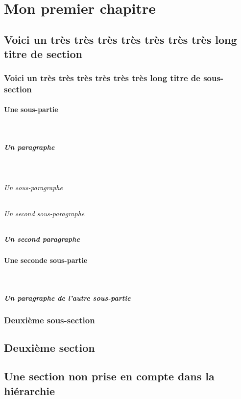 \chapter{Mon premier chapitre}
\section[Un très long titre de section]{Voici un très très très très très très très long titre de section}
\subsection[Un très long titre de sous-section]{Voici un très très très très très très long titre de sous-section}
\blindtext
\subsubsection{Une sous-partie}
\blindtext[2]\\ 
\paragraph{Un paragraphe}
\blindtext[2]\\
\blindtext
\subparagraph{Un sous-paragraphe}
\blindtext[5]
\subparagraph{Un second sous-paragraphe}
\blindtext[4]
\paragraph{Un second paragraphe}
\blindtext[7]
\subsubsection{Une seconde sous-partie}
\blindtext[4]\\ 
\paragraph{Un paragraphe de l'autre sous-partie}
\blindtext[2]
\subsection{Deuxième sous-section}
\blindtext[11]
\section{Deuxième section}
\blindtext[25]

\section*{Une section non prise en compte dans la hiérarchie}
\blindtext[7]